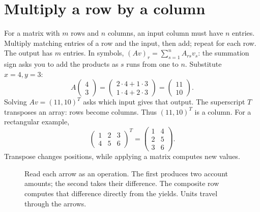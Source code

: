 \section{Multiply a row by a column}
For a matrix with $m$ rows and $n$ columns, an input column must have $n$
entries. Multiply matching entries of a row and the input, then add; repeat
for each row. The output has $m$ entries. In symbols,
$(Av)_r=\sum_{s=1}^n A_{rs}v_s$: the summation sign asks you to add the
products as $s$ runs from one to $n$.
Substitute $x=4,y=3$:
\[
 A\begin{pmatrix}4\\3\end{pmatrix}
 =\begin{pmatrix}2\cdot4+1\cdot3\\1\cdot4+2\cdot3\end{pmatrix}
 =\begin{pmatrix}11\\10\end{pmatrix}.
\]
Solving $Av=(11,10)^T$ asks which input gives that output. The superscript
$T$ transposes an array: rows become columns. Thus $(11,10)^T$ is a column.
For a rectangular example,
\[
 \begin{pmatrix}1&2&3\\4&5&6\end{pmatrix}^{T}
 =\begin{pmatrix}1&4\\2&5\\3&6\end{pmatrix}.
\]
Transpose changes positions, while applying a matrix computes new values.

\begin{figure}[htbp]
\centering

\caption{Read each arrow as an operation. The first produces two account
amounts; the second takes their difference. The composite row computes
that difference directly from the yields. Units travel through the arrows.}
\end{figure}

